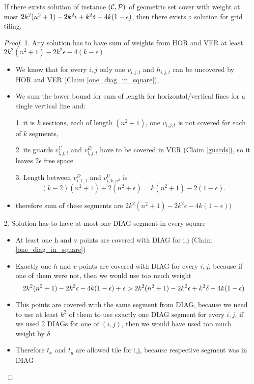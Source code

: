 \begin{lemma}
	If there exists solution  of instance $(\mathcal{C}, \mathcal{P})$
	of geometric set cover
	with weight at most $2k^2(n^2+1) - 2k^2\epsilon +k^2\delta -4k(1-\epsilon)$,
	then there exists a solution for grid tiling.
\end{lemma}

\begin{proof}
1. Any solution has to have sum of weights from HOR and VER at least
$2k^2(n^2+1) -2k^2\epsilon -4(k-\epsilon)$
\begin{itemize}
\item We know that for every $i,j$ only one $v_{i,j,t}$ and $h_{i,j,t}$
can be uncovered by HOR and VER (Claim \ref{one_diag_in_square}),
\item We sum the lower bound for sum of length for horizontal/vertical
lines for a single vertical line and:

1. it is $k$ sections, each
of length $(n^2+1)$, one $v_{i,j,t}$ is not covered for each of $k$ segments,

2. its guards $v^U_{i,j,t}$ and $v^D_{i,j,t}$
have to be covered in VER (Claim \ref{guards}), so it leaves $2\epsilon$
free space

3. Length between $v^D_{i, 1, 1}$ and $v^U_{i, k, n^2}$
is $$(k-2)(n^2+1) + 2(n^2 + \epsilon) = k(n^2+1) - 2(1 - \epsilon).$$

\item
therefore sum of these segments are
$2k^2(n^2+1) -2k^2\epsilon -4k(1-\epsilon))$
\end{itemize}

2. Solution has to have at most one DIAG segment in every square
\begin{itemize}
\item At least one h and v points are covered with DIAG for i,j
	(Claim \ref{one_diag_in_square})
\item Exactly one $h$ and $v$ points are covered with DIAG for every $i,j$,
because if one of them were not, then we would use too much weight
$$2k^2(n^2+1) -2k^2\epsilon -4k(1-\epsilon) + \epsilon > 2k^2(n^2+1) - 2k^2\epsilon +k^2\delta -4k(1-\epsilon)$$
\item This points are covered with the same segment from DIAG,
because we need to use at least $k^2$ of them to use
exactly one DIAG segment for every $i,j$, if we used 2 DIAGs
for one of $(i,j)$, then we would have used too much weight by $\delta$
\item Therefore $t_x$ and $t_y$ are allowed tile for i,j,
because respective segment was in DIAG
\end{itemize}


\end{proof}
